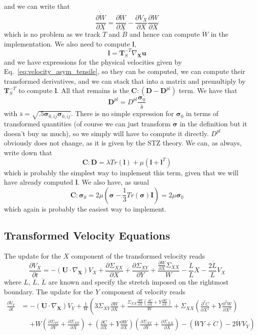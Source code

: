 \documentclass[12pt,a4paper]{article}
\newcommand{\p}{\partial}
\newcommand{\bU}{\mathbf{U}}
\newcommand{\bX}{\mathbf{X}}
\newcommand{\bu}{\mathbf{u}}
\newcommand{\Grad}{\nabla_{\bX}}
\newcommand{\Adv}{\left(\bU \cdot \nabla_{\bX}\right)}
\newcommand{\SXX}{\Sigma_{XX}}
\newcommand{\SYY}{\Sigma_{YY}}
\newcommand{\SXY}{\Sigma_{XY}}
\newcommand{\bsig}{\boldsymbol\sigma}
\newcommand{\bT}{\mathbf{T}}
\newcommand{\bC}{\mathbf{C}}
\newcommand{\bD}{\mathbf{D}}
\newcommand{\bDpl}{\mathbf{D}^{pl}}
\newcommand{\Dpl}{D^{pl}}
\newcommand{\bl}{\mathbf{l}}
\newcommand{\bI}{\mathbf{I}}
\begin{document}
and we can write that
\begin{equation}
    \dot{\overline{\frac{\partial W}{\partial X}}} = \frac{\partial \dot{W}}{\partial X} - \frac{\partial V_X}{\partial X}\frac{\partial W}{\partial X}
\end{equation}
which is no problem as we track $\dot{T}$ and $\dot{B}$ and hence can compute $\dot{W}$ in the implementation. We also need to compute $\bl$,
\begin{equation}
    \bl = \bT_S^{-T}\Grad\bu
\end{equation}
and we have expressions for the physical velocities given by Eq.~\ref{eq:velocity_asym_tensile}, so they can be computed, we can compute their transformed derivatives, and we can stack that into a matrix and premultiply by $\bT_S^{-T}$ to compute $\bl$. All that remains is the $\bC:\left(\bD - \bDpl\right)$ term. We have that
\begin{equation}
    \bDpl = \Dpl \frac{\bsig_0}{\bar{s}}
\end{equation}
with $\bar{s} = \sqrt{.5\bsig_{0, ij}\bsig_{0, ij}}$. There is no simple expression for $\bsig_0$ in terms of transformed quantities (of course we can just transform $\bsig$ in the definition but it doesn't buy us much), so we simply will have to compute it directly. $\Dpl$ obviously does not change, as it is given by the STZ theory. We can, as always, write down that
\begin{equation}
    \bC:\bD = \lambda Tr(\bl) + \mu (\bl + \bl^T)
\end{equation}
which is probably the simplest way to implement this term, given that we will have already computed $\bl$. We also have, as usual
\begin{equation}
    \bC : \bsig_0 = 2\mu\left(\bsig - \frac{1}{3}Tr(\bsig)\bI\right) = 2\mu \bsig_0
\end{equation}
which again is probably the easiest way to implement.
\subsection{Transformed Velocity Equations}
The update for the $X$ component of the transformed velocity reads
\begin{equation}
    \frac{\p V_X}{\p t} = -\Adv V_X + \frac{\partial \SXX}{\p X} + \frac{\p \SXY}{\p Y} + \frac{\frac{\p W}{\p X}\SXX}{W} - \frac{\ddot{L}}{L}X - \frac{2\dot{L}}{L}V_X
\end{equation}
where $L$, $\dot{L}$, $\ddot{L}$ are known and specify the stretch imposed on the rightmost boundary. The update for the $Y$ component of velocity reads
\begin{align}
    \frac{\p V_Y}{\p t} &= -\Adv V_Y + \frac{1}{W}\left(3 \SXY\frac{\p W}{\p X} + \frac{\SXX \frac{\p W}{\p X}\left(\frac{\p C}{\p X} + Y\frac{\p W}{\p X}\right)}{W} + \SXX\left(\frac{\p^2 C}{\p X^2} + Y\frac{\p^2 W}{\p X^2}\right)\right.\nonumber\\ 
    &\phantom{=} \left. + W\left(\frac{\p \SYY}{\p Y} + \frac{\p \SXY}{\p X}\right) + \left(\frac{\p C}{\p X} + Y \frac{\p W}{\p X}\right)\left(\frac{\p \SXY}{\p Y} + \frac{\p \SXX}{\p X}\right) - \left(\ddot{W}Y + \ddot{C}\right) - 2\dot{W}V_Y\right)
\end{align}
\end{document}
